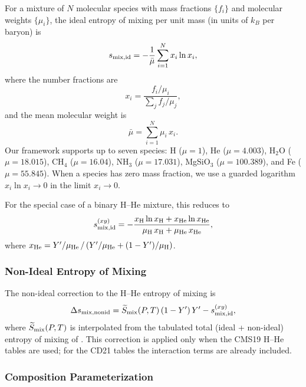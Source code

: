 \documentclass[twocolumn]{aastex701}
\begin{document}
For a mixture of $N$ molecular species with mass fractions $\{f_i\}$ and molecular weights $\{\mu_i\}$, the ideal entropy of mixing per unit mass (in units of $k_B$ per baryon) is
\begin{equation}\label{eq:smix_id}
    s_{\rm mix,id} = -\frac{1}{\bar{\mu}} \sum_{i=1}^{N} x_i \ln x_i,
\end{equation}
where the number fractions are
\begin{equation}
    x_i = \frac{f_i / \mu_i}{\sum_j f_j / \mu_j},
\end{equation}
and the mean molecular weight is
\begin{equation}
    \bar{\mu} = \sum_{i=1}^{N} \mu_i\, x_i.
\end{equation}
Our framework supports up to seven species: H ($\mu=1$), He ($\mu=4.003$), H$_2$O ($\mu=18.015$), CH$_4$ ($\mu=16.04$), NH$_3$ ($\mu=17.031$), MgSiO$_3$ ($\mu=100.389$), and Fe ($\mu=55.845$).
When a species has zero mass fraction, we use a guarded logarithm $x_i \ln x_i \to 0$ in the limit $x_i \to 0$.

For the special case of a binary H--He mixture, this reduces to
\begin{equation}\label{eq:smix_id_y}
    s_{\rm mix,id}^{(xy)} = -\frac{x_{\rm H}\ln x_{\rm H} + x_{\rm He}\ln x_{\rm He}}{\mu_{\rm H}\,x_{\rm H} + \mu_{\rm He}\,x_{\rm He}},
\end{equation}
where $x_{\rm He} = Y'/\mu_{\rm He}\,/\,(Y'/\mu_{\rm He} + (1-Y')/\mu_{\rm H})$.

\subsubsection{Non-Ideal Entropy of Mixing}

The non-ideal correction to the H--He entropy of mixing is
\begin{equation}\label{eq:smix_nonid}
    \Delta s_{\rm mix,nonid} = \widetilde{S}_{\rm mix}(P,T)\,(1-Y')\,Y' - s_{\rm mix,id}^{(xy)},
\end{equation}
where $\widetilde{S}_{\rm mix}(P,T)$ is interpolated from the tabulated total (ideal + non-ideal) entropy of mixing of \citet{Howard2023a}.
This correction is applied only when the CMS19 H--He tables are used; for the CD21 tables the interaction terms are already included.

\subsubsection{Composition Parameterization}
\end{document}
